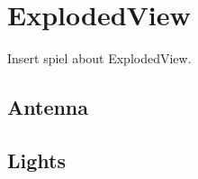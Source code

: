 

\clearpage
\section{ExplodedView}
Insert spiel about ExplodedView.

\subsection{Antenna}


\subsection{Lights}

